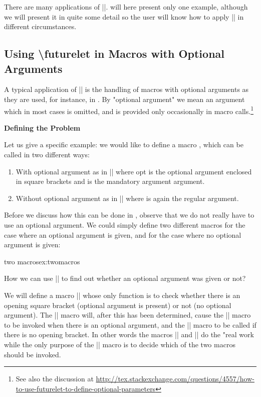 There are many applications of |\futurelet|.
will here present only one example, although
we will present it in quite some detail so the user
will know how to apply |\futurelet| in different
circumstances.

\subsection{Using \textbackslash futurelet in Macros with Optional
Arguments}

A typical application of |\futurelet| is the handling
of macros with optional arguments\cite{Becht1988} as they are used,
for instance, in \latex. By "optional argument" we
mean an argument which in most cases is omitted,
and is provided only occasionally in macro calls.\footnote{See also the discussion at \url{http://tex.stackexchange.com/questions/4557/how-to-use-futurelet-to-define-optional-parameters}}

\textbf{Defining the Problem}

Let us give a specific example: we would like to
define a macro , which can be called in two
different ways:

\begin{enumerate}
\item With optional argument as in ||
where opt is the optional argument enclosed
in square brackets and  is the mandatory argument
argument.

\item Without optional argument as in ||
where  is again the regular argument.

\end{enumerate}


Before we discuss how this can be done in \tex,
observe that we do not really have to use an
optional argument. We could simply define two
different macros  for the case where an
optional argument is given, and  for the
case where no optional argument is given:


\begin{texexample}{two macros}{ex:twomacros}
\def\xxWithOpt [#1]#2{...}
\def\xxNoOpt #1{...}
\def\xxWithOpt (#1)#2{\fbox{#2}}
\xxWithOpt (box){Testing}
\end{texexample}

How we can use |\futurelet| to find out
whether an optional argument was given or not?

We will define a macro |\xx| whose only function is
to check whether there is an opening square bracket
(optional argument is present) or not (no optional
argument). The |\xx| macro will, after this has been
determined, cause the |\xxWithOpt| macro to be invoked
when there is an optional argument, and the
|\xxNoOpt| macro to be called if there is no opening
bracket. In other words the macros |\xxWithOpt|
and |\xxNoOpt| do the "real work while the only
purpose of the |\xx| macro is to decide which of the
two macros should be invoked.


